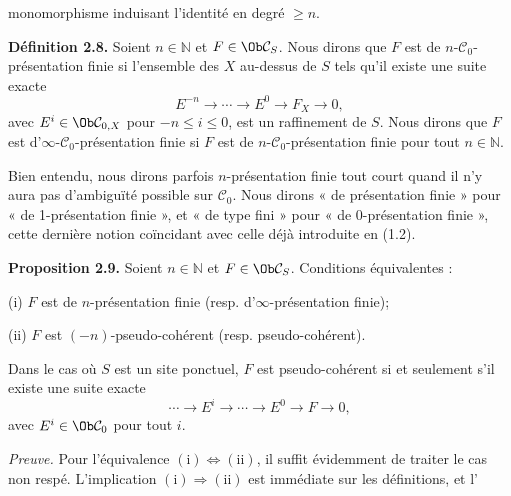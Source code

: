 monomorphisme induisant l'identité en degré \(\geq n\).

\textbf{Définition 2.8.} Soient \(n\in\mathbb N\) et \(F\in\Ob\mathcal C_S\). Nous dirons que \(F\) est de \(n\)-\(\mathcal C_0\)-présentation finie si l'ensemble des \(X\) au-dessus de \(S\) tels qu'il existe une suite exacte
\[
  E^{-n}\longrightarrow\cdots\longrightarrow E^0\longrightarrow F_X\longrightarrow 0,
\]
avec \(E^i\in\Ob\mathcal C_{0,X}\) pour \(-n\leq i\leq 0\), est un raffinement de \(S\). Nous dirons que \(F\) est d'\(\infty\)-\(\mathcal C_0\)-présentation finie si \(F\) est de \(n\)-\(\mathcal C_0\)-présentation finie pour tout \(n\in\mathbb N\).

Bien entendu, nous dirons parfois \(n\)-présentation finie tout court quand il n'y aura pas d'ambiguïté possible sur \(\mathcal C_0\). Nous dirons « de présentation finie » pour « de 1-présentation finie », et « de type fini » pour « de 0-présentation finie », cette dernière notion coïncidant avec celle déjà introduite en (1.2).

\textbf{Proposition 2.9.} Soient \(n\in\mathbb N\) et \(F\in\Ob\mathcal C_S\). Conditions équivalentes :

(i) \(F\) est de \(n\)-présentation finie (resp. d'\(\infty\)-présentation finie);

(ii) \(F\) est \((-n)\)-pseudo-cohérent (resp. pseudo-cohérent).

Dans le cas où \(S\) est un site ponctuel, \(F\) est pseudo-cohérent si et seulement s'il existe une suite exacte
\[
  \cdots\longrightarrow E^i\longrightarrow\cdots\longrightarrow E^0\longrightarrow F\longrightarrow 0,
\]
avec \(E^i\in\Ob\mathcal C_0\) pour tout \(i\).

\emph{Preuve.} Pour l'équivalence \((\mathrm{i})\Leftrightarrow(\mathrm{ii})\), il suffit évidemment de traiter le cas non respé. L'implication \((\mathrm{i})\Rightarrow(\mathrm{ii})\) est immédiate sur les définitions, et l'%
